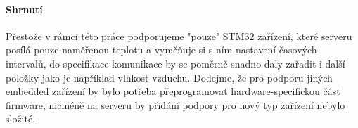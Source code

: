 \paragraph{Shrnutí}
Přestože v rámci této práce podporujeme "pouze" STM32 zařízení, které serveru posílá pouze naměřenou
teplotu a vyměňuje si s ním nastavení časových intervalů, do specifikace komunikace by se poměrně
snadno daly zařadit i další položky jako je například vlhkost vzduchu.
Dodejme, že pro podporu jiných embedded zařízení by bylo potřeba přeprogramovat hardware-specifickou
část firmware, nicméně na serveru by přidání podpory pro nový typ zařízení nebylo složité.

